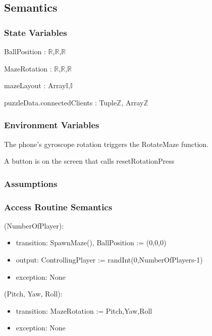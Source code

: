 \documentclass[12pt, titlepage]{article}
\begin{document}
\subsection{Semantics}

\subsubsection{State Variables}

BallPosition : {$\mathbb{R}$,$\mathbb{R}$,$\mathbb{R}$}

\noindent MazeRotation : {$\mathbb{R}$,$\mathbb{R}$,$\mathbb{R}$}

\noindent mazeLayout : Array\textlangle$\mathds{I}$,$\mathds{I}$\textrangle

\noindent puzzleData.connectedClients : Tuple\textlangle$\mathds{Z}$, Array\textlangle$\mathds{Z}$\textrangle\textrangle



\subsubsection{Environment Variables}

The phone's gyroscope rotation triggers the RotateMaze function. 

\noindent A button is on the screen that calls resetRotationPress

\subsubsection{Assumptions}

\subsubsection{Access Routine Semantics}

(NumberOfPlayer):
\begin{itemize}
\item transition: SpawnMaze(), BallPosition := (0,0,0)
\item output: ControllingPlayer := randInt(0,NumberOfPlayers-1)
\item exception: None
\end{itemize}

(Pitch, Yaw, Roll):
\begin{itemize}
\item transition: MazeRotation := {Pitch,Yaw,Roll}
\item exception: None
\end{itemize}
\end{document}
